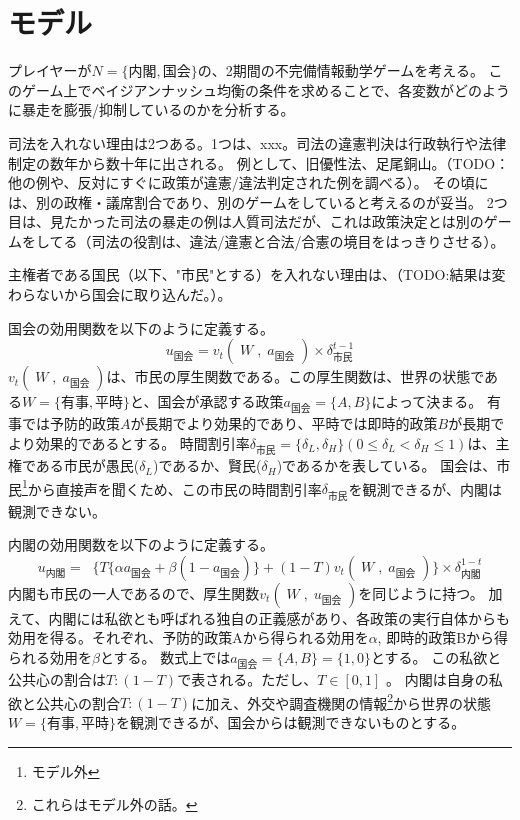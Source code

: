 \documentclass[main.tex]{subfiles}
\begin{document}
\section{モデル}

プレイヤーが$N=\lbrace 内閣, 国会 \rbrace$の、2期間の不完備情報動学ゲームを考える。
このゲーム上でベイジアンナッシュ均衡の条件を求めることで、各変数がどのように暴走を膨張/抑制しているのかを分析する。



司法を入れない理由は2つある。1つは、xxx。司法の違憲判決は行政執行や法律制定の数年から数十年に出される。
例として、旧優性法、足尾銅山。（TODO：他の例や、反対にすぐに政策が違憲/違法判定された例を調べる）。
その頃には、別の政権・議席割合であり、別のゲームをしていると考えるのが妥当。
2つ目は、見たかった司法の暴走の例は人質司法だが、これは政策決定とは別のゲームをしてる（司法の役割は、違法/違憲と合法/合憲の境目をはっきりさせる）。

主権者である国民（以下、"市民"とする）を入れない理由は、（TODO:結果は変わらないから国会に取り込んだ。）。


国会の効用関数を以下のように定義する。
$$u_\text{国会} = v_t(\;W\;,\; a_\text{国会}\;) × \delta^{t-1}_\text{市民}$$
$v_t(\;W\;,\; a_\text{国会}\;)$は、市民の厚生関数である。この厚生関数は、世界の状態である$W=\lbrace 有事, 平時\rbrace$と、国会が承認する政策$a_{国会}=\lbrace A, B\rbrace$によって決まる。
有事では予防的政策$A$が長期でより効果的であり、平時では即時的政策$B$が長期でより効果的であるとする。
時間割引率$\delta_{市民}=\lbrace \delta_L, \delta_H \rbrace (0\le \delta_L<\delta_H \le 1)$は、主権である市民が愚民($\delta_L$)であるか、賢民($\delta_H$)であるかを表している。
国会は、市民\footnote{モデル外}から直接声を聞くため、この市民の時間割引率$\delta_{市民}$を観測できるが、内閣は観測できない。

内閣の効用関数を以下のように定義する。
$$ u_\text{内閣} =\;\; \lbrace T\lbrace \alpha a_\text{国会} + \beta (1-a_\text{国会}) \rbrace  + (1-T)v_t(\;W\;,\; a_\text{国会}\;) \rbrace × \delta^{1-t}_{内閣}$$
内閣も市民の一人であるので、厚生関数$v_t(\;W\;,\; u_\text{国会}\;)$を同じように持つ。
加えて、内閣には私欲とも呼ばれる独自の正義感があり、各政策の実行自体からも効用を得る。それぞれ、予防的政策Aから得られる効用を$\alpha$, 即時的政策Bから得られる効用を$\beta$とする。
数式上では$a_{国会}=\lbrace A, B\rbrace = \lbrace 1,0\rbrace$とする。
この私欲と公共心の割合は$T:(1-T)$で表される。ただし、$T\in[0,1]$ 。
内閣は自身の私欲と公共心の割合$T:(1-T)$に加え、外交や調査機関の情報\footnote{これらはモデル外の話。}から世界の状態$W=\lbrace 有事, 平時\rbrace$を観測できるが、国会からは観測できないものとする。
\end{document}
